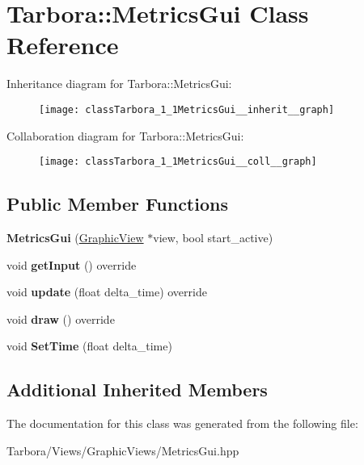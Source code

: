 \hypertarget{classTarbora_1_1MetricsGui}{}\section{Tarbora\+:\+:Metrics\+Gui Class Reference}
\label{classTarbora_1_1MetricsGui}


Inheritance diagram for Tarbora\+:\+:Metrics\+Gui\+:
\nopagebreak
\begin{figure}[H]
\begin{center}
\leavevmode
\texttt{[image: classTarbora\_1\_1MetricsGui\_\_inherit\_\_graph]}
\end{center}
\end{figure}


Collaboration diagram for Tarbora\+:\+:Metrics\+Gui\+:
\nopagebreak
\begin{figure}[H]
\begin{center}
\leavevmode
\texttt{[image: classTarbora\_1\_1MetricsGui\_\_coll\_\_graph]}
\end{center}
\end{figure}
\subsection*{Public Member Functions}
\begin{DoxyCompactItemize}
\item 
\mbox{\label{classTarbora_1_1MetricsGui_ac765e76dddb13b5caa1fb0037467ee45}} 
{\bfseries Metrics\+Gui} (\hyperlink{classTarbora_1_1GraphicView}{Graphic\+View} $\ast$view, bool start\+\_\+active)
\item 
\mbox{\label{classTarbora_1_1MetricsGui_a6efa7ebc05866401aa96235e4d96feb6}} 
void {\bfseries get\+Input} () override
\item 
\mbox{\label{classTarbora_1_1MetricsGui_a16532223c4313a559e58b51a5af4cb62}} 
void {\bfseries update} (float delta\+\_\+time) override
\item 
\mbox{\label{classTarbora_1_1MetricsGui_a2dc79e283aa20a6d0838f6edbb5fa701}} 
void {\bfseries draw} () override
\item 
\mbox{\label{classTarbora_1_1MetricsGui_ae5d19518e7841b39e44f7b88c95f9d93}} 
void {\bfseries Set\+Time} (float delta\+\_\+time)
\end{DoxyCompactItemize}
\subsection*{Additional Inherited Members}


The documentation for this class was generated from the following file\+:\begin{DoxyCompactItemize}
\item 
Tarbora/\+Views/\+Graphic\+Views/Metrics\+Gui.\+hpp\end{DoxyCompactItemize}
